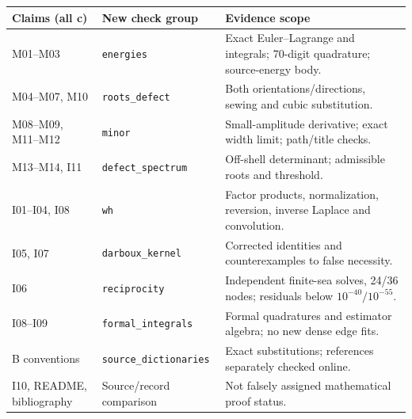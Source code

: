\documentclass[11pt,a4paper]{article}
\newcommand{\file}[1]{\nolinkurl{#1}}
\begin{document}
\begin{longtable}{@{}L{3cm}L{5.5cm}L{6.4cm}@{}}
\toprule Claims (all c) & New check group & Evidence scope\\\midrule\endhead
M01--M03 & \file{energies} & Exact Euler--Lagrange and integrals; 70-digit quadrature; source-energy body.\\
M04--M07, M10 & \file{roots_defect} & Both orientations/directions, sewing and cubic substitution.\\
M08--M09, M11--M12 & \file{minor} & Small-amplitude derivative; exact width limit; path/title checks.\\
M13--M14, I11 & \file{defect_spectrum} & Off-shell determinant; admissible roots and threshold.\\
I01--I04, I08 & \file{wh} & Factor products, normalization, reversion, inverse Laplace and convolution.\\
I05, I07 & \file{darboux_kernel} & Corrected identities and counterexamples to false necessity.\\
I06 & \file{reciprocity} & Independent finite-sea solves, 24/36 nodes; residuals below $10^{-40}/10^{-55}$.\\
I08--I09 & \file{formal_integrals} & Formal quadratures and estimator algebra; no new dense edge fits.\\
B conventions & \file{source_dictionaries} & Exact substitutions; references separately checked online.\\
I10, README, bibliography & Source/record comparison & Not falsely assigned mathematical proof status.\\
\bottomrule
\end{longtable}
\end{document}

